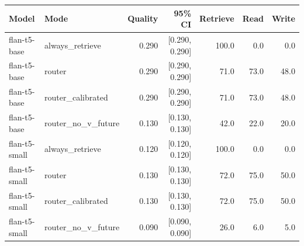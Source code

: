 \begin{tabular}{llrrrrr}
\toprule
Model & Mode & Quality & 95\% CI & Retrieve & Read & Write \\
\midrule
flan-t5-base & always\_retrieve & 0.290 & [0.290, 0.290] & 100.0 & 0.0 & 0.0 \\
flan-t5-base & router & 0.290 & [0.290, 0.290] & 71.0 & 73.0 & 48.0 \\
flan-t5-base & router\_calibrated & 0.290 & [0.290, 0.290] & 71.0 & 73.0 & 48.0 \\
flan-t5-base & router\_no\_v\_future & 0.130 & [0.130, 0.130] & 42.0 & 22.0 & 20.0 \\
flan-t5-small & always\_retrieve & 0.120 & [0.120, 0.120] & 100.0 & 0.0 & 0.0 \\
flan-t5-small & router & 0.130 & [0.130, 0.130] & 72.0 & 75.0 & 50.0 \\
flan-t5-small & router\_calibrated & 0.130 & [0.130, 0.130] & 72.0 & 75.0 & 50.0 \\
flan-t5-small & router\_no\_v\_future & 0.090 & [0.090, 0.090] & 26.0 & 6.0 & 5.0 \\
\bottomrule
\end{tabular}

